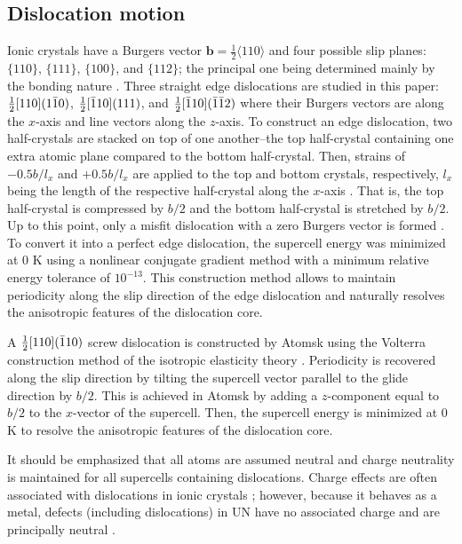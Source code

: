 \documentclass[applsci,article,submit,pdftex,moreauthors]{Definitions/mdpi}
\newcommand{\?}{\stackrel{?}{=}}
\begin{document}
\subsection{Dislocation motion}

Ionic crystals have a Burgers vector $\mathbf{b} = \frac{1}{2} \langle 110 \rangle$ and four possible slip planes: $\{ 110 \}$, $\{ 111 \}$, $\{ 100 \}$, and $\{ 112 \}$; the principal one being determined mainly by the bonding nature \cite{Hull2011, Yadav2014}. Three straight edge dislocations are studied in this paper: $\frac{1}{2} [ 110 ] ( 1 \Bar{1} 0 )$, $\frac{1}{2} [ \Bar{1} 1 0 ] ( 111 )$, and $\frac{1}{2} [ \Bar{1} 10 ] ( \Bar{1} \Bar{1} 2 )$ where their Burgers vectors are along the $x$-axis and line vectors along the $z$-axis. To construct an edge dislocation, two half-crystals are stacked on top of one another--the top half-crystal containing one extra atomic plane compared to the bottom half-crystal. Then, strains of $-0.5b/l_x$ and $+0.5b/l_x$ are applied to the top and bottom crystals, respectively, $l_x$ being the length of the respective half-crystal along the $x$-axis \cite{Osetsky2003}. That is, the top half-crystal is compressed by $b/2$ and the bottom half-crystal is stretched by $b/2$. Up to this point, only a misfit dislocation with a zero Burgers vector is formed \cite{Osetsky2003}. To convert it into a perfect edge dislocation, the supercell energy was minimized at 0 K using a nonlinear conjugate gradient method with a minimum relative energy tolerance of $10^{-13}$. This construction method allows to maintain periodicity along the slip direction of the edge dislocation and naturally resolves the anisotropic features of the dislocation core.

A $\frac{1}{2} [ 110 ] ( \Bar{1} 1 0 )$ screw dislocation is constructed by Atomsk using the Volterra construction method of the isotropic elasticity theory \cite{Hull2011}. Periodicity is recovered along the slip direction by tilting the supercell vector parallel to the glide direction by $b/2$. This is achieved in Atomsk by adding a $z$-component equal to $b/2$ to the $x$-vector of the supercell. Then, the supercell energy is minimized at 0 K to resolve the anisotropic features of the dislocation core.

It should be emphasized that all atoms are assumed neutral and charge neutrality is maintained for all supercells containing dislocations. Charge effects are often associated with dislocations in ionic crystals \cite{Smoluchowski1966}; however, because it behaves as a metal, defects (including dislocations) in UN have no associated charge and are principally neutral \cite{Cooper2023}.
\end{document}
